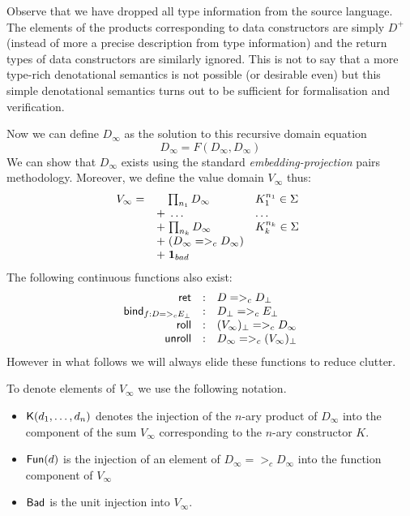 Observe that we have dropped all type information from the source
language. The elements of the products corresponding to data
constructors are simply $D^{+}$ (instead of more a precise description
from type information) and the return types of data constructors are
similarly ignored. This is not to say that a more type-rich
denotational semantics is not possible (or desirable even) but this
simple denotational semantics turns out to be sufficient for
formalisation and verification.


Now we can define $D_{\infty}$ as the solution to this recursive domain equation
$$D_{\infty} = F( D_{\infty}, D_{\infty})$$
We can show that $D_{\infty}$ exists using the 
standard {\em embedding-projection} pairs methodology. Moreover, we define the
value domain $V_{\infty}$ thus:
    \[V_{\infty} = \begin{array}[t]{ll}
             \quad\;{\prod_{n_1}{D_{\infty}}} & K_1^{n_1} \in \Sigma \\
             \; + \;\ldots                    & \ldots \\
             \; + \;{\prod_{n_k}{D_{\infty}}} & K_k^{n_k} \in \Sigma \\ 
             \; + \;(D_{\infty} =>_c D_{\infty}) \\
             \; + \;{\sf{\bf 1}}_{bad} \quad
    \end{array}\]
The following continuous functions also exist:
\[\begin{array}{rcl}
  \mathsf{ret}   & : & D =>_c D_\bot \\ 
  \mathsf{bind}_{f : D =>_c E_\bot} & : & D_\bot =>_c E_\bot \\
  \mathsf{roll} & : & (V_{\infty})_\bot =>_c D_{\infty} \\ 
  \mathsf{unroll} & : &D_{\infty} =>_c (V_{\infty})_\bot
\end{array}\] 
However in what follows we will always elide these functions to reduce clutter.

To denote elements of $V_{\infty}$ we use the following notation.
\begin{itemize}
\item $\mathsf{K}(d_1, \ldots, d_n)$ denotes the injection of
the $n$-ary product of $D_{\infty}$ into the component of the sum 
$V_{\infty}$ corresponding to the $n$-ary constructor $K$.  
\item $\mathsf{Fun}(d)$ is the injection of 
an element of $D_{\infty} =>_c D_{\infty}$ into the function component of $V_{\infty}$
\item $\mathsf{Bad}$ is the unit injection into $V_{\infty}$.
\end{itemize}

